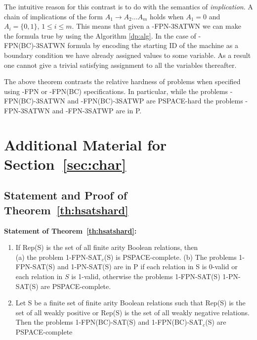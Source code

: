  








The intuitive reason for this contrast is to do with the semantics of 
{\em implication}. 
A chain of implications of the form $A_1 \rightarrow A_2 \ldots A_m$ 
holds when $A_1 = 0$ and $ A_i = \{0,1\}$, $ 1 \leq i \leq m$.  
This means that given a {-FPN-3SATWN} 
we can make the formula true by using the Algorithm \ref{dp:alg}.
In the case of {-FPN(BC)-3SATWN} formula by encoding the starting ID 
of the 
machine as a boundary condition we have already assigned values to some 
variable. As a result one cannot give a trivial satisfying assignment to
all the variables thereafter.


The above theorem contrasts the relative hardness of problems when specified
using {-FPN} or 
{-FPN(BC)} specifications. In particular, while the
problems {-FPN(BC)-3SATWN} and 
{-FPN(BC)-3SATWP} are {\sf PSPACE}-hard the problems
{-FPN-3SATWN} and {-FPN-3SATWP} are in {\sf P}.

\section{Additional Material for Section~\ref{sec:char}}
\label{sec:appC}

\subsection{Statement and Proof of Theorem~\ref{th:hsatshard}}

\noindent
\textbf{Statement of Theorem~\ref{th:hsatshard}:}~
\begin{enumerate}
\item
If Rep(S) is the set of all finite arity Boolean relations, then\\
(a) the problem 1-FPN-SAT$_c$(S) is PSPACE-complete.
(b) The problems 1-FPN-SAT(S) and 1-PN-SAT(S) are  in P if each relation
in S is 0-valid or each relation in $S$ is 1-valid, otherwise
the problems 1-FPN-SAT(S) 1-PN-SAT(S) are  PSPACE-complete.
\item
Let S be a finite set of finite arity Boolean relations such that
Rep(S) is the set of all weakly positive or Rep(S) is the set
of all weakly negative relations. Then
the problems 1-FPN(BC)-SAT(S) and 1-FPN(BC)-SAT$_c$(S) are PSPACE-complete
\end{enumerate}

